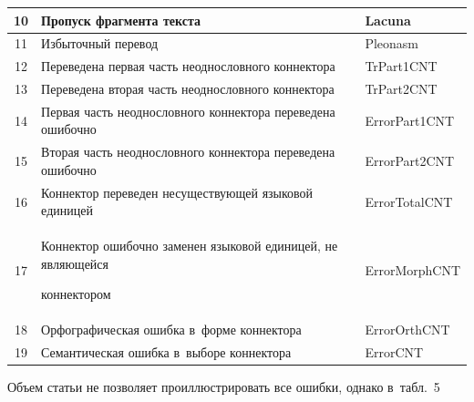 \begin{table}
\begin{center}
\begin{tabular}{|c|p{80mm}|l|}
10\hphantom{9}&Пропуск фрагмента текста&Lacuna\\


\hline


11\hphantom{9}&Избыточный перевод&Pleonasm\\


\hline


12\hphantom{9}&Переведена первая часть неоднословного коннектора&TrPart1CNT\\


\hline


13\hphantom{9}&Переведена вторая часть неоднословного коннектора&TrPart2CNT\\


\hline


14\hphantom{9}&Первая часть неоднословного коннектора переведена ошибочно&ErrorPart1CNT\\


\hline


15\hphantom{9}&Вторая часть неоднословного коннектора переведена ошибочно&ErrorPart2CNT\\


\hline


16\hphantom{9}&Коннектор переведен несуществующей языковой единицей&ErrorTotalCNT\\


\hline


17\hphantom{9}&Коннектор ошибочно заменен языковой единицей, не являющейся 


коннектором&ErrorMorphCNT\\


\hline


18\hphantom{9}&Орфографическая ошибка в~форме коннектора&ErrorOrthCNT\\


\hline


19\hphantom{9}&Семантическая ошибка в~выборе коннектора&ErrorCNT\\


\hline


\end{tabular}


\end{center}


\vspace*{-12pt}


\end{table}


  


  Объем статьи не позволяет проиллюстрировать все ошибки, однако в~табл.~5 


